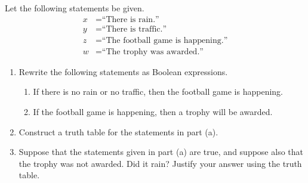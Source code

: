 \documentclass{article}
\theoremstyle{definition}
\begin{document}
\begin{question}
	Let the following statements be given.
		\begin{align*}
		x &= \text{``There is rain.''}\\
		y &= \text{``There is traffic.''}\\
		z &= \text{``The football game is happening.''}\\
		w &= \text{``The trophy was awarded.''}
		\end{align*}
	\begin{enumerate}
		\item Rewrite the following statements as Boolean expressions.
			\begin{enumerate}
			\item If there is no rain or no traffic, then the football game is happening.
			\item If the football game is happening, then a trophy will be awarded.
			\end{enumerate}
		\item Construct a truth table for the statements in part (a).
		\item Suppose that the statements given in part (a) are true, and suppose also that the trophy was not awarded. Did it rain? Justify your answer using the truth table.
	\end{enumerate}
\end{question}
\end{document}
